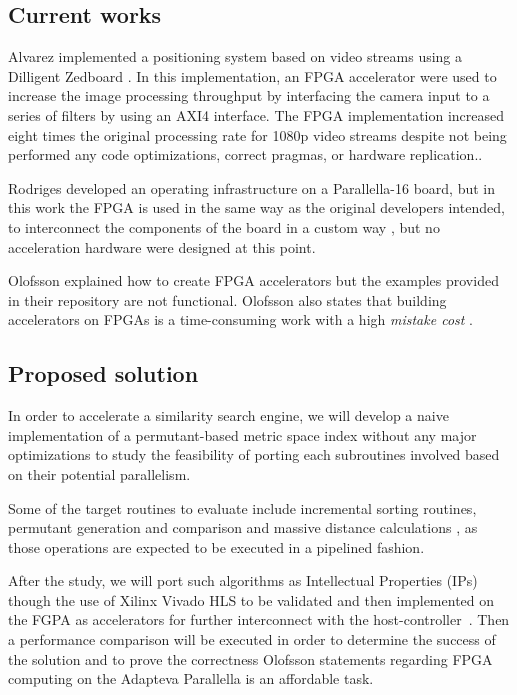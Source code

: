 \documentclass[11pt,letterpaper]{article}
\begin{document}
\subsection{Current works} 
    Alvarez \cite{SPA_thesis} implemented a positioning system based on video streams using a Dilligent Zedboard 
    \cite{DILLIGENT_zedboard_reference}. In this implementation, an FPGA accelerator were used to increase the 
    image processing throughput by interfacing the camera input to a series of filters by using an AXI4 interface.
    The FPGA implementation increased eight times the original processing rate for 1080p video streams despite not 
    being performed any code optimizations, correct pragmas, or hardware replication.\cite{XILINX_hls_ultrafast}.

    Rodriges \cite{BR_thesis} developed an operating infrastructure on a Parallella-16 board, but in this work
    the FPGA is used in the same way as the original developers intended, to interconnect the components of the
    board in a custom way \cite{DBLP:journals/corr/OlofssonNZ14}, but no acceleration hardware were designed at this
    point.

    Olofsson \cite{PARALLELLA_accelerator} explained how to create FPGA accelerators but the examples provided
    in their repository are not functional. Olofsson also states that building accelerators on FPGAs is a
    time-consuming work with a high \emph{mistake cost} \cite{PARALLELLA_accelerator}. 
    
\subsection{Proposed solution}
    In order to accelerate a similarity search engine, we will develop a naive implementation of a 
    permutant-based metric space index without any major optimizations to study the feasibility of porting
    each subroutines involved based on their potential parallelism.

    Some of the target routines to evaluate include incremental sorting routines\cite{7416566}, permutant generation 
    and comparison\cite{5271946} and massive distance calculations \cite{5271944,5271946}, as those operations
    are expected to be executed in a pipelined fashion.

    After the study, we will port such algorithms as Intellectual Properties (IPs) though the use of Xilinx Vivado 
    HLS to be validated and then implemented on the FGPA as accelerators for further interconnect with the 
    host-controller \cite{SPA_thesis, XILINX_hls_design_guide, XILINX_hls_reference, XILINX_software_guide, 
    XILINX_hls_design_tuto, XILINX_hls_ultrafast}. Then a performance comparison will be executed in order to 
    determine the success of the solution and to prove the correctness Olofsson statements regarding FPGA computing
    \cite{PARALLELLA_accelerator} on the Adapteva Parallella is an affordable task.
\end{document}
